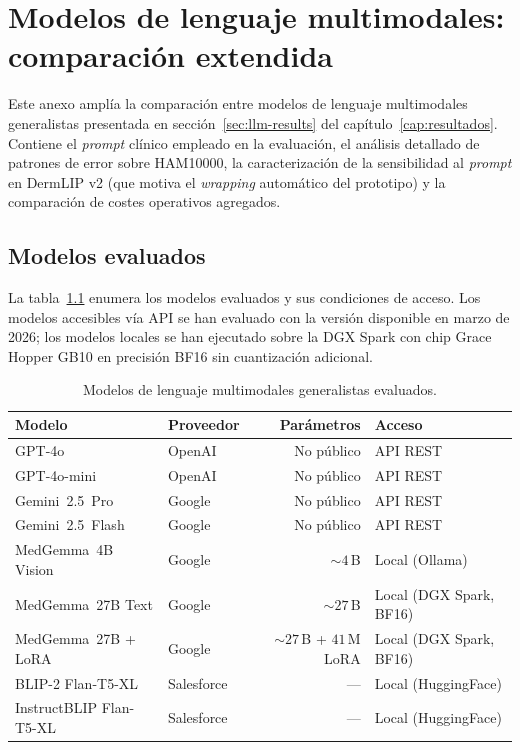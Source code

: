 
\chapter{Modelos de lenguaje multimodales: comparación extendida}
\label{cap:anexog}

Este anexo amplía la comparación entre modelos de lenguaje
multimodales generalistas presentada en sección~\ref{sec:llm-results} del
capítulo~\ref{cap:resultados}. Contiene el \emph{prompt} clínico
empleado en la evaluación, el análisis detallado de patrones de
error sobre HAM10000, la caracterización de la sensibilidad al
\emph{prompt} en DermLIP v2 (que motiva el \emph{wrapping}
automático del prototipo) y la comparación de costes operativos
agregados.

\section{Modelos evaluados}
\label{sec:anexoh-modelos}

La tabla~\ref{tab:anexoh-modelos} enumera los modelos evaluados y
sus condiciones de acceso. Los modelos accesibles vía API se han
evaluado con la versión disponible en marzo de 2026; los modelos
locales se han ejecutado sobre la DGX Spark con chip Grace Hopper
GB10 en precisión BF16 sin cuantización adicional.

\begin{table}[H]
\centering
\footnotesize
\setlength{\tabcolsep}{4pt}
\renewcommand{\arraystretch}{0.95}
\caption{Modelos de lenguaje multimodales generalistas evaluados.}
\label{tab:anexoh-modelos}
\begin{tabular}{llrl}
\hline
Modelo                     & Proveedor   & Parámetros & Acceso \\
\hline
GPT-4o                     & OpenAI      & No público  & API REST \\
GPT-4o-mini                & OpenAI      & No público  & API REST \\
Gemini~2.5~Pro             & Google      & No público  & API REST \\
Gemini~2.5~Flash           & Google      & No público  & API REST \\
MedGemma~4B Vision         & Google      & $\sim 4$\,B & Local (Ollama) \\
MedGemma~27B Text          & Google      & $\sim 27$\,B & Local (DGX Spark, BF16) \\
MedGemma~27B + LoRA        & Google      & $\sim 27$\,B + $41$\,M LoRA & Local (DGX Spark, BF16) \\
BLIP-2 Flan-T5-XL          & Salesforce  & ---         & Local (HuggingFace) \\
InstructBLIP Flan-T5-XL    & Salesforce  & ---         & Local (HuggingFace) \\
\hline
\end{tabular}
\end{table}

